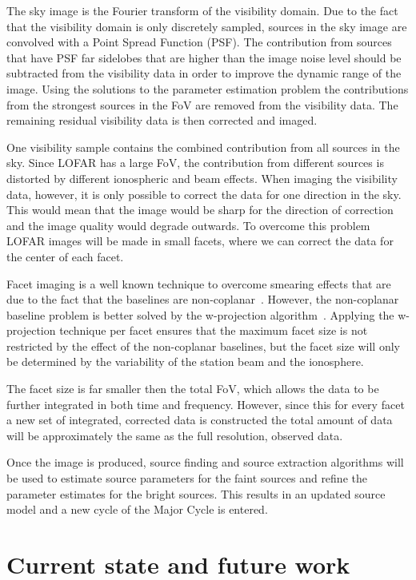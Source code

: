 \documentclass[journal]{IEEEtran}
\begin{document}
The sky image is the Fourier transform of the visibility domain. Due to the fact that the visibility domain is only discretely sampled, sources in the sky image are convolved with a Point Spread Function (PSF). The contribution from sources that have PSF far sidelobes that are higher than the image noise level should be subtracted from the visibility data in order to improve the dynamic range of the image. Using the solutions to the parameter estimation problem the contributions from the strongest sources in the FoV are removed from the visibility data. The remaining residual visibility data is then corrected and imaged.

One visibility sample contains the combined contribution from all sources in the sky. Since LOFAR has a large FoV, the contribution from different sources is distorted by different ionospheric and beam effects. When imaging the visibility data, however, it is only possible to correct the data for one direction in the sky. This would mean that the image would be sharp for the direction of correction and the image quality would degrade outwards. To overcome this problem LOFAR images will be made in small facets, where we can correct the data for the center of each facet. 

Facet imaging is a well known technique to overcome smearing effects that are due to the fact that the baselines are non-coplanar~\cite{SIRAII:99}. However, the non-coplanar baseline problem is better solved by the w-projection algorithm~\cite{Cornwell:05}. Applying the w-projection technique per facet ensures that the maximum facet size is not restricted by the effect of the non-coplanar baselines, but the facet size will only be determined by the variability of the station beam and the ionosphere.

The facet size is far smaller then the total FoV, which allows the data to be further integrated in both time and frequency. However, since this for every facet a new set of integrated, corrected data is constructed the total amount of data will be approximately the same as the full resolution, observed data.
  
Once the image is produced, source finding and source extraction algorithms will be used to estimate source parameters for the faint sources and refine the parameter estimates for the bright sources. This results in an updated source model and a new cycle of the Major Cycle is entered. 

\section{Current state and future work}
\end{document}
